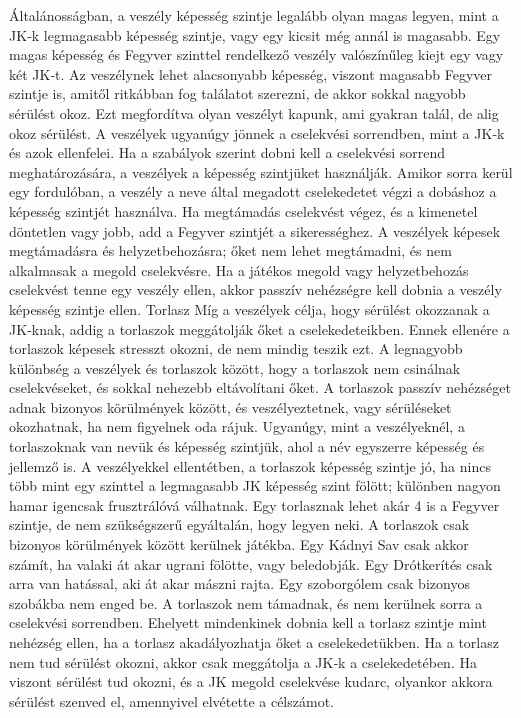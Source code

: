 \documentclass[oneside]{book}
\begin{document}
Általánosságban, a veszély képesség szintje legalább olyan magas legyen, mint a JK‑k legmagasabb képesség szintje, vagy egy kicsit még annál is magasabb. Egy magas képesség és Fegyver szinttel rendelkező veszély valószínűleg kiejt egy vagy két JK‑t. Az veszélynek lehet alacsonyabb képesség, viszont magasabb Fegyver szintje is, amitől ritkábban fog találatot szerezni, de akkor sokkal nagyobb sérülést okoz. Ezt megfordítva olyan veszélyt kapunk, ami gyakran talál, de alig okoz sérülést.
A veszélyek ugyanúgy jönnek a cselekvési sorrendben, mint a JK‑k és azok ellenfelei. Ha a szabályok szerint dobni kell a cselekvési sorrend meghatározására, a veszélyek a képesség szintjüket használják. Amikor sorra kerül egy fordulóban, a veszély a neve által megadott cselekedetet végzi a dobáshoz a képesség szintjét használva. Ha megtámadás cselekvést végez, és a kimenetel döntetlen vagy jobb, add a Fegyver szintjét a sikerességhez. A veszélyek képesek megtámadásra és helyzetbehozásra; őket nem lehet megtámadni, és nem alkalmasak a megold cselekvésre.
Ha a játékos megold vagy helyzetbehozás cselekvést tenne egy veszély ellen, akkor passzív nehézségre kell dobnia a veszély képesség szintje ellen.
Torlasz
Míg a veszélyek célja, hogy sérülést okozzanak a JK‑knak, addig a torlaszok meggátolják őket a cselekedeteikben. Ennek ellenére a torlaszok képesek stresszt okozni, de nem mindig teszik ezt. A legnagyobb különbség a veszélyek és torlaszok között, hogy a torlaszok nem csinálnak cselekvéseket, és sokkal nehezebb eltávolítani őket. A torlaszok passzív nehézséget adnak bizonyos körülmények között, és veszélyeztetnek, vagy sérüléseket okozhatnak, ha nem figyelnek oda rájuk.
Ugyanúgy, mint a veszélyeknél, a torlaszoknak van nevük és képesség szintjük, ahol a név egyszerre képesség és jellemző is. A veszélyekkel ellentétben, a torlaszok képesség szintje jó, ha nincs több mint egy szinttel a legmagasabb JK képesség szint fölött; különben nagyon hamar igencsak frusztrálóvá válhatnak. Egy torlasznak lehet akár 4 is a Fegyver szintje, de nem szükségszerű egyáltalán, hogy legyen neki.
A torlaszok csak bizonyos körülmények között kerülnek játékba. Egy Kádnyi Sav csak akkor számít, ha valaki át akar ugrani fölötte, vagy beledobják. Egy Drótkerítés csak arra van hatással, aki át akar mászni rajta. Egy szoborgólem csak bizonyos szobákba nem enged be.
A torlaszok nem támadnak, és nem kerülnek sorra a cselekvési sorrendben. Ehelyett mindenkinek dobnia kell a torlasz szintje mint nehézség ellen, ha a torlasz akadályozhatja őket a cselekedetükben. Ha a torlasz nem tud sérülést okozni, akkor csak meggátolja a JK‑k a cselekedetében. Ha viszont sérülést tud okozni, és a JK megold cselekvése kudarc, olyankor akkora sérülést szenved el, amennyivel elvétette a célszámot.
\end{document}
